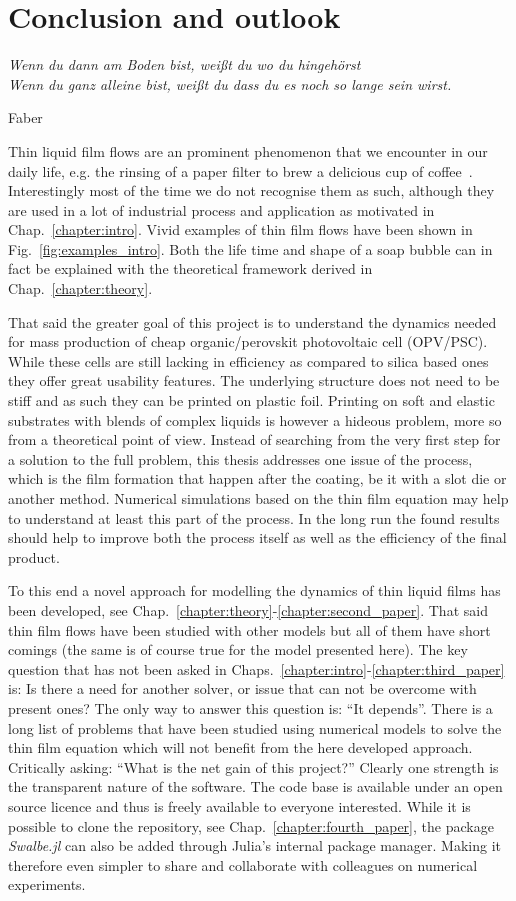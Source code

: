 \chapter{Conclusion and outlook}
\label{chapter:conclusion}
\epigraph{\textit{Wenn du dann am Boden bist, weißt du wo du hingehörst\\ Wenn du ganz alleine bist, weißt du dass du es noch so lange sein wirst.}}{Faber}

Thin liquid film flows are an prominent phenomenon that we encounter in our daily life, e.g. the rinsing of a paper filter to brew a delicious cup of coffee~\cite{gagné2021physics}.
Interestingly most of the time we do not recognise them as such, although they are used in a lot of industrial process and application as motivated in Chap.~\ref{chapter:intro}.
Vivid examples of thin film flows have been shown in Fig.~\ref{fig:examples_intro}. 
Both the life time and shape of a soap bubble can in fact be explained with the theoretical framework derived in Chap.~\ref{chapter:theory}.

That said the greater goal of this project is to understand the dynamics needed for mass production of cheap organic/perovskit photovoltaic cell (OPV/PSC).
While these cells are still lacking in efficiency as compared to silica based ones they offer great usability features.
The underlying structure does not need to be stiff and as such they can be printed on plastic foil.
Printing on soft and elastic substrates with blends of complex liquids is however a hideous problem, more so from a theoretical point of view.
Instead of searching from the very first step for a solution to the full problem, this thesis addresses one issue of the process, which is the film formation that happen after the coating, be it with a slot die or another method.
Numerical simulations based on the thin film equation may help to understand at least this part of the process.
In the long run the found results should help to improve both the process itself as well as the efficiency of the final product.

To this end a novel approach for modelling the dynamics of thin liquid films has been developed, see Chap.~\ref{chapter:theory}-\ref{chapter:second_paper}.
That said thin film flows have been studied with other models but all of them have short comings (the same is of course true for the model presented here).
The key question that has not been asked in Chaps.~\ref{chapter:intro}-\ref{chapter:third_paper} is: Is there a need for another solver, or issue that can not be overcome with present ones? 
The only way to answer this question is: ``It depends''.
There is a long list of problems that have been studied using numerical models to solve the thin film equation which will not benefit from the here developed approach.
Critically asking: ``What is the net gain of this project?''
Clearly one strength is the transparent nature of the software. 
The code base is available under an open source licence and thus is freely available to everyone interested.
While it is possible to clone the repository, see Chap.~\ref{chapter:fourth_paper}, the package \textit{Swalbe.jl} can also be added through Julia's internal package manager.
Making it therefore even simpler to share and collaborate  with colleagues on numerical experiments. 

